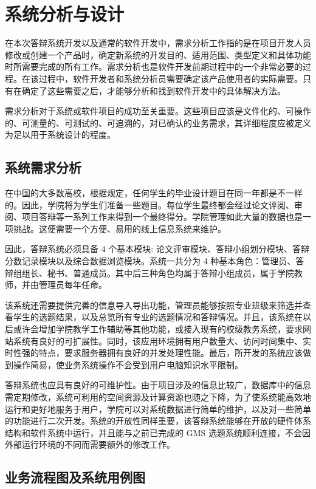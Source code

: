 \section{系统分析与设计}

在本次答辩系统开发以及通常的软件开发中，需求分析工作指的是在项目开发人员修改或创建一个产品时，确定新系统的开发目的、适用范围、类型定义和具体功能时所需要完成的所有工作。需求分析也是软件开发前期过程中的一个非常必要的过程。在该过程中，软件开发者和系统分析员需要确定该产品使用者的实际需要。只有在确定了这些需要之后，才能够分析和找到软件开发中的具体解决方法。

需求分析对于系统或软件项目的成功至关重要。这些项目应该是文件化的、可操作的、可测量的、可测试的、可追溯的，对已确认的业务需求，其详细程度应被定义为足以用于系统设计的程度。

\subsection{系统需求分析}

在中国的大多数高校，根据规定，任何学生的毕业设计题目在同一年都是不一样的。因此，学院将为学生们准备一些题目。每位学生最终都会经过论文评阅、审阅、项目答辩等一系列工作来得到一个最终得分。学院管理如此大量的数据也是一项挑战。这便需要一个方便、易用的线上信息系统来维护。

因此，答辩系统必须具备 4 个基本模块: 论文评审模块、答辩小组划分模块、答辩分数记录模块以及综合数据浏览模块。系统一共分为 4 种基本角色：管理员、答辩组组长、秘书、普通成员。其中后三种角色均属于答辩小组成员，属于学院教师，并由管理员每年任命。

该系统还需要提供完善的信息导入导出功能，管理员能够按照专业班级来筛选并查看学生的选题结果，以及总览所有专业的选题情况和答辩情况。并且，该系统在以后或许会增加学院教学工作辅助等其他功能，或接入现有的校级教务系统，要求网站系统有良好的可扩展性。同时，该应用环境拥有用户数量大、访问时间集中、实时性强的特点，要求服务器拥有良好的并发处理性能。最后，所开发的系统应该做到操作简易，使业务系统操作不会受到用户电脑知识水平限制。

答辩系统也应具有良好的可维护性。由于项目涉及的信息比较广，数据库中的信息需定期修改，系统可利用的空间资源及计算资源也随之下降，为了使系统能高效地运行和更好地服务于用户，学院可以对系统数据进行简单的维护，以及对一些简单的功能进行二次开发。系统的开放性同样重要，该答辩系统能够在开放的硬件体系结构和软件系统中运行，并且能与之前已完成的 GMS 选题系统顺利连接，不会因外部运行环境的不同而需要额外的修改工作。


\subsection{业务流程图及系统用例图}

